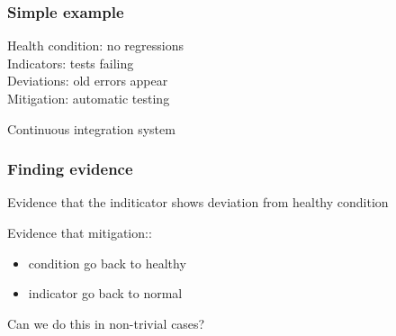 \documentclass[17pt,aspectratio=169,hyperref=pdfusetitle]{beamer}
\begin{document}
\begin{frame}[fragile]
  \frametitle{Simple example}

  Health condition: no regressions \\
  Indicators: tests failing \\
  Deviations: old errors appear \\
  Mitigation: automatic testing \\

  \begin{center}
    Continuous integration system
  \end{center}
\end{frame}

\begin{frame}[fragile]
  \frametitle{Finding evidence}

  Evidence that the inditicator shows
  deviation from healthy condition

  Evidence that mitigation::

  \begin{itemize}
  \item condition go back to healthy
  \item indicator go back to normal
  \end{itemize}
  
\end{frame}

\begin{frame}[fragile]

  \begin{center}
    Can we do this in non-trivial cases?
  \end{center}
  
\end{frame}
\end{document}
